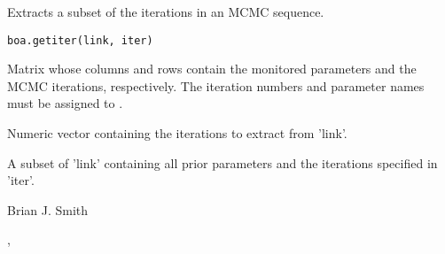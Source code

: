 \begin{Description}\relax
Extracts a subset of the iterations in an MCMC sequence.
\end{Description}
\begin{Usage}
\begin{verbatim}
boa.getiter(link, iter)
\end{verbatim}
\end{Usage}
\begin{Arguments}
\begin{ldescription}
\item[\code{link}] Matrix whose columns and rows contain the monitored parameters
and the MCMC iterations, respectively. The iteration numbers and parameter
names must be assigned to .
\item[\code{iter}] Numeric vector containing the iterations to extract from 'link'.
\end{ldescription}
\end{Arguments}
\begin{Value}
A subset of 'link' containing all prior parameters and the iterations specified
in 'iter'.
\end{Value}
\begin{Author}\relax
Brian J. Smith
\end{Author}
\begin{SeeAlso}\relax
{}, 
\end{SeeAlso}

